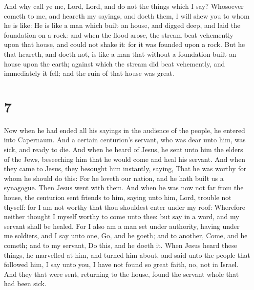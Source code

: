 And why call ye me, Lord, Lord, and do not the things
which I say?  Whosoever cometh to me, and heareth my
sayings, and doeth them, I will shew you to whom he is like:
 He is like a man which built an house, and digged deep,
and laid the foundation on a rock: and when the flood arose, the stream
beat vehemently upon that house, and could not shake it: for it was
founded upon a rock.  But he that heareth, and doeth not,
is like a man that without a foundation built an house upon the earth;
against which the stream did beat vehemently, and immediately it fell;
and the ruin of that house was great.

\hypertarget{section-6}{%
\section{7}\label{section-6}}

 Now when he had ended all his sayings in the audience of
the people, he entered into Capernaum.  And a certain
centurion's servant, who was dear unto him, was sick, and ready to die.
 And when he heard of Jesus, he sent unto him the elders
of the Jews, beseeching him that he would come and heal his servant.
 And when they came to Jesus, they besought him instantly,
saying, That he was worthy for whom he should do this: 
For he loveth our nation, and he hath built us a synagogue.
 Then Jesus went with them. And when he was now not far
from the house, the centurion sent friends to him, saying unto him,
Lord, trouble not thyself: for I am not worthy that thou shouldest enter
under my roof:  Wherefore neither thought I myself worthy
to come unto thee: but say in a word, and my servant shall be healed.
 For I also am a man set under authority, having under me
soldiers, and I say unto one, Go, and he goeth; and to another, Come,
and he cometh; and to my servant, Do this, and he doeth it.
 When Jesus heard these things, he marvelled at him, and
turned him about, and said unto the people that followed him, I say unto
you, I have not found so great faith, no, not in Israel. 
And they that were sent, returning to the house, found the servant whole
that had been sick.

